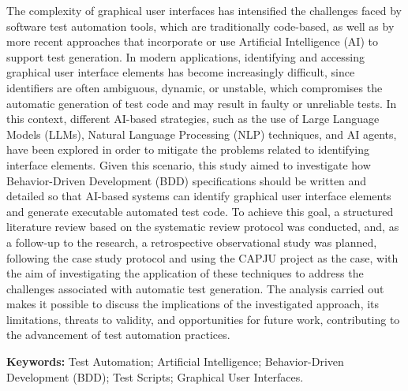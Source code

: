 \begin{resumo}[Abstract]
  The complexity of graphical user interfaces has intensified the challenges faced by software test automation tools, which are traditionally code-based, as well as by more recent approaches that incorporate or use Artificial Intelligence (AI) to support test generation. In modern applications, identifying and accessing graphical user interface elements has become increasingly difficult, since identifiers are often ambiguous, dynamic, or unstable, which compromises the automatic generation of test code and may result in faulty or unreliable tests. In this context, different AI-based strategies, such as the use of Large Language Models (LLMs), Natural Language Processing (NLP) techniques, and AI agents, have been explored in order to mitigate the problems related to identifying interface elements. Given this scenario, this study aimed to investigate how Behavior-Driven Development (BDD) specifications should be written and detailed so that AI-based systems can identify graphical user interface elements and generate executable automated test code. To achieve this goal, a structured literature review based on the systematic review protocol was conducted, and, as a follow-up to the research, a retrospective observational study was planned, following the case study protocol and using the CAPJU project as the case, with the aim of investigating the application of these techniques to address the challenges associated with automatic test generation. The analysis carried out makes it possible to discuss the implications of the investigated approach, its limitations, threats to validity, and opportunities for future work, contributing to the advancement of test automation practices.

\textbf{Keywords:} Test Automation; Artificial Intelligence; Behavior-Driven Development (BDD); Test Scripts; Graphical User Interfaces.
\end{resumo}
